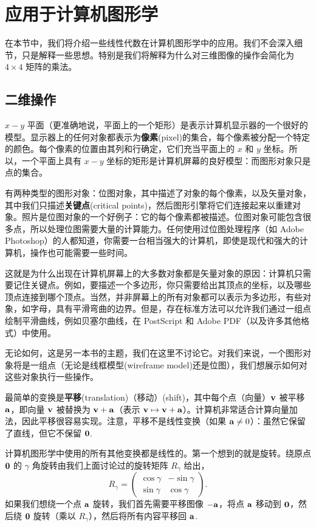 \section{应用于计算机图形学}\label{sec:01-08}

在本节中，我们将介绍一些线性代数在计算机图形学中的应用。我们不会深入细节，只是解释一些思想。特别是我们将解释为什么对三维图像的操作会简化为 $4 \times 4$ 矩阵的乘法。

\subsection{二维操作}\label{sec:01-08-01}

$x-y$ 平面（更准确地说，平面上的一个矩形）是表示计算机显示器的一个很好的模型。显示器上的任何对象都表示为\textbf{像素}(pixel)的集合，每个像素被分配一个特定的颜色。每个像素的位置由其列和行确定，它们充当平面上的 $x$ 和 $y$ 坐标。所以，一个平面上具有 $x-y$ 坐标的矩形是计算机屏幕的良好模型：而图形对象只是点的集合。

\begin{remark*}
有两种类型的图形对象：位图对象，其中描述了对象的每个像素，以及矢量对象，其中我们只描述\textbf{关键点}(critical points)，然后图形引擎将它们连接起来以重建对象。照片是位图对象的一个好例子：它的每个像素都被描述。位图对象可能包含很多点，所以处理位图需要大量的计算能力。任何使用过位图处理程序（如 Adobe Photoshop）的人都知道，你需要一台相当强大的计算机，即使是现代和强大的计算机，操作也可能需要一些时间。
\end{remark*}

这就是为什么出现在计算机屏幕上的大多数对象都是矢量对象的原因：计算机只需要记住关键点。例如，要描述一个多边形，你只需要给出其顶点的坐标，以及哪些顶点连接到哪个顶点。当然，并非屏幕上的所有对象都可以表示为多边形，有些对象，如字母，具有平滑弯曲的边界。但是，存在标准方法可以允许我们通过一组点绘制平滑曲线，例如贝塞尔曲线，在 PostScript 和 Adobe PDF（以及许多其他格式）中使用。

无论如何，这是另一本书的主题，我们在这里不讨论它。对我们来说，一个图形对象将是一组点（无论是线框模型(wireframe model)还是位图），我们想展示如何对这些对象执行一些操作。

最简单的变换是\textbf{平移}(translation)（移动）(shift)，其中每个点（向量）$\mathbf{v}$ 被平移 $\mathbf{a}$，即向量 $\mathbf{v}$ 被替换为 $\mathbf{v} + \mathbf{a}$（表示 $ \mathbf{v} \mapsto \mathbf{v} + \mathbf{a} $）。计算机非常适合计算向量加法，因此平移很容易实现。注意，平移不是线性变换（如果 $\mathbf{a} \neq 0$）：虽然它保留了直线，但它不保留 $\mathbf{0}$.~

计算机图形学中使用的所有其他变换都是线性的。第一个想到的就是旋转。绕原点 $\mathbf{0}$ 的 $\gamma$ 角旋转由我们上面讨论过的旋转矩阵 $R_\gamma$ 给出， $$R_\gamma = \begin{pmatrix} \cos \gamma & -\sin \gamma \\ \sin \gamma & \cos \gamma \end{pmatrix}.$$
如果我们想绕一个点 $\mathbf{a}$ 旋转，我们首先需要平移图像 $-\mathbf{a}$，将点 $\mathbf{a}$ 移动到 $\mathbf{0}$，然后绕 $\mathbf{0}$ 旋转（乘以 $R_\gamma$），然后将所有内容平移回 $\mathbf{a}$.~

